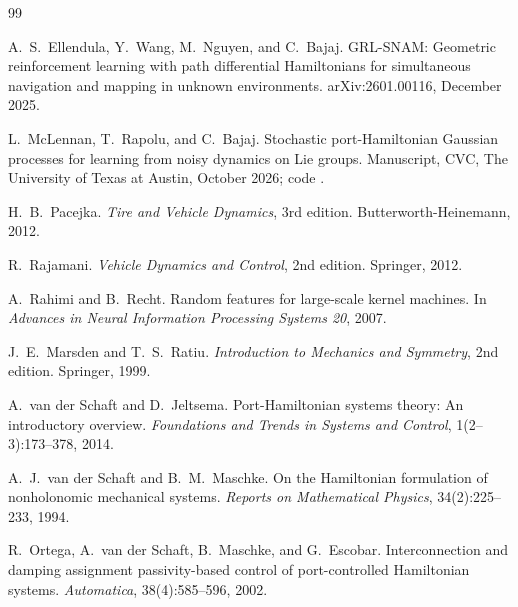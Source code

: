 \documentclass[11pt]{article}
\theoremstyle{remark}
\begin{document}
\begin{thebibliography}{99}

A.~S.~Ellendula, Y.~Wang, M.~Nguyen, and C.~Bajaj.
\newblock GRL-SNAM: Geometric reinforcement learning with path differential Hamiltonians for
simultaneous navigation and mapping in unknown environments.
\newblock arXiv:2601.00116, December 2025.

L.~McLennan, T.~Rapolu, and C.~Bajaj.
\newblock Stochastic port-Hamiltonian Gaussian processes for learning from noisy dynamics on Lie
groups.
\newblock Manuscript, CVC, The University of Texas at Austin, October 2026; code
.

H.~B.~Pacejka.
\newblock \emph{Tire and Vehicle Dynamics}, 3rd edition.
\newblock Butterworth-Heinemann, 2012.

R.~Rajamani.
\newblock \emph{Vehicle Dynamics and Control}, 2nd edition.
\newblock Springer, 2012.

A.~Rahimi and B.~Recht.
\newblock Random features for large-scale kernel machines.
\newblock In \emph{Advances in Neural Information Processing Systems 20}, 2007.

J.~E.~Marsden and T.~S.~Ratiu.
\newblock \emph{Introduction to Mechanics and Symmetry}, 2nd edition.
\newblock Springer, 1999.

A.~van der Schaft and D.~Jeltsema.
\newblock Port-Hamiltonian systems theory: An introductory overview.
\newblock \emph{Foundations and Trends in Systems and Control}, 1(2--3):173--378, 2014.

A.~J.~van der Schaft and B.~M.~Maschke.
\newblock On the Hamiltonian formulation of nonholonomic mechanical systems.
\newblock \emph{Reports on Mathematical Physics}, 34(2):225--233, 1994.

R.~Ortega, A.~van der Schaft, B.~Maschke, and G.~Escobar.
\newblock Interconnection and damping assignment passivity-based control of port-controlled
Hamiltonian systems.
\newblock \emph{Automatica}, 38(4):585--596, 2002.

\end{thebibliography}
\end{document}
